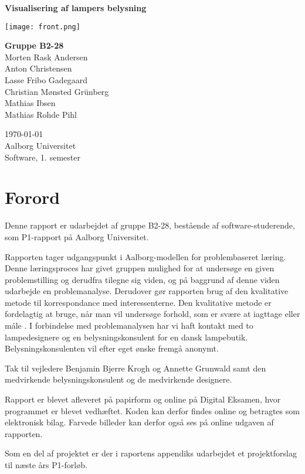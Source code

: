 \begin{titlepage}
  \vspace{0.2cm}
  \begin{center}
    \Huge{\textbf{Visualisering af lampers belysning}}
  \end{center}
  \vspace{0.2cm}
  \vfill
  \begin{center}
  \texttt{[image: front.png]}
  \end{center}
  \begin{center}
    \Large{\textbf{Gruppe B2-28}}\\
	Morten Rask Andersen\\
	Anton Christensen\\
	Lasse Fribo Gadegaard\\
	Christian Mønsted Grünberg\\
	Mathias Ibsen\\
	Mathias Rohde Pihl
  \end{center}
  \begin{center}
 	\today\\
    Aalborg Universitet\\
    Software, 1. semester
  \end{center}
\end{titlepage}



\addtocounter{page}{-1}
\clearpage



\clearpage


\section{Forord}
Denne rapport er udarbejdet af gruppe B2-28, bestående af software-studerende, som P1-rapport på Aalborg Universitet.

Rapporten tager udgangspunkt i Aalborg-modellen for problembaseret læring. Denne læringsproces har givet gruppen mulighed for at undersøge en given problemstilling og derudfra tilegne sig viden, og på baggrund af denne viden udarbejde en problemanalyse. Derudover gør rapporten brug af den kvalitative metode til korrespondance med interessenterne. Den kvalitative metode er fordelagtig at bruge, når man vil undersøge forhold, som er svære at iagttage eller måle \cite{kvalitativ_metode}. I forbindelse med problemanalysen har vi haft kontakt med to lampedesignere og en belysningskonsulent for en dansk lampebutik. Belysningskonsulenten vil efter eget ønske fremgå anonymt. 

Tak til vejledere Benjamin Bjerre Krogh og Annette Grunwald samt den medvirkende belysningskonsulent og de medvirkende designere.

Rapport er blevet afleveret på papirform og online på Digital Eksamen, hvor programmet er blevet vedhæftet. Koden kan derfor findes online og betragtes som elektronisk bilag. Farvede billeder kan derfor også ses på online udgaven af rapporten. 

Som en del af projektet er der i raportens appendiks udarbejdet et projektforslag til næste års P1-forløb.
\clearpage

\clearpage